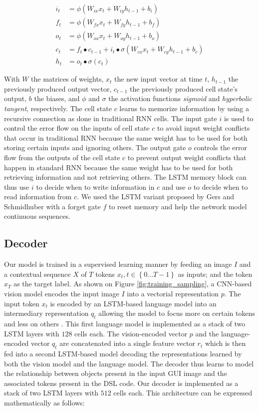 \documentclass{article}
\begin{document}
\begin{align}
    i_t &= \phi(W_{ix}x_{t} + W_{iy}h_{t-1} + b_i)\\
    f_t &= \phi(W_{fx}x_{t} + W_{fy}h_{t-1} + b_f)\\
    o_t &= \phi(W_{ox}x_{t} + W_{oy}h_{t-1} + b_o)\\
    c_t &= f_{t}\bullet c_{t-1} + i_{t}\bullet \sigma(W_{cx}x_{t} + W_{cy}h_{t-1} + b_c)\\
    h_t &= o_{t}\bullet \sigma(c_{t})
\end{align}

With $W$ the matrices of weights, $x_t$ the new input vector at time $t$, $h_{t-1}$ the previously produced output vector, $c_{t-1}$ the previously produced cell state's output, $b$ the biases, and $\phi$ and $\sigma$ the activation functions \emph{sigmoid} and \emph{hyperbolic tangent}, respectively. The cell state $c$ learns to memorize information by using a recursive connection as done in traditional RNN cells. The input gate $i$ is used to control the error flow on the inputs of cell state $c$ to avoid input weight conflicts that occur in traditional RNN because the same weight has to be used for both storing certain inputs and ignoring others. The output gate $o$ controls the error flow from the outputs of the cell state $c$ to prevent output weight conflicts that happen in standard RNN because the same weight has to be used for both retrieving information and not retrieving others. The LSTM memory block can thus use $i$ to decide when to write information in $c$ and use $o$ to decide when to read information from $c$. We used the LSTM variant proposed by Gers and Schmidhuber \cite{gers2000learning} with a forget gate $f$ to reset memory and help the network model continuous sequences.

\subsection{Decoder}

Our model is trained in a supervised learning manner by feeding an image $I$ and a contextual sequence $X$ of $T$ tokens $x_t, t\in \left\{ 0\ldots T-1 \right\}$ as inputs; and the token $x_{T}$ as the target label.
As shown on Figure \ref{fig:training_sampling}, a CNN-based vision model encodes the input image $I$ into a vectorial representation $p$. The input token $x_t$ is encoded by an LSTM-based language model into an intermediary representation $q_t$ allowing the model to focus more on certain tokens and less on others \cite{graves2013generating}. This first language model is implemented as a stack of two LSTM layers with $128$ cells each.
The vision-encoded vector $p$ and the language-encoded vector $q_t$ are concatenated into a single feature vector $r_t$ which is then fed into a second LSTM-based model decoding the representations learned by both the vision model and the language model. The decoder thus learns to model the relationship between objects present in the input GUI image and the associated tokens present in the DSL code. Our decoder is implemented as a stack of two LSTM layers with $512$ cells each. This architecture can be expressed mathematically as follows:
\end{document}
